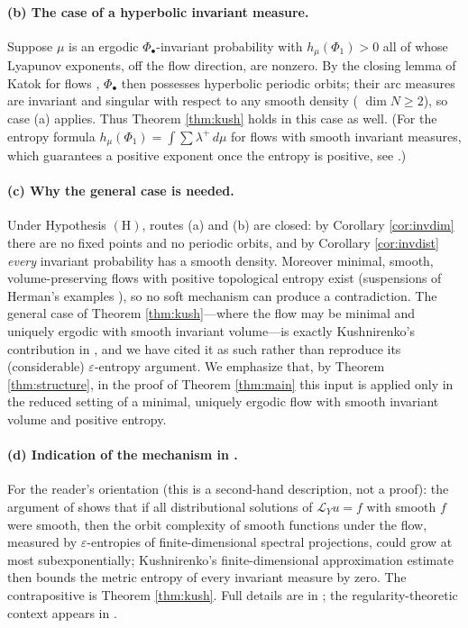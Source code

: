 \documentclass[11pt]{amsart}
\theoremstyle{plain}
\theoremstyle{definition}
\theoremstyle{remark}
\begin{document}
\paragraph{(b) The case of a hyperbolic invariant measure.}
Suppose $\mu$ is an ergodic $\Phi_\bullet$-invariant probability with
$h_\mu(\Phi_1)>0$ all of whose Lyapunov exponents, off the flow
direction, are nonzero. By the closing lemma of Katok for flows
\cite{Katok,KH}, $\Phi_\bullet$ then possesses hyperbolic periodic
orbits; their arc measures are invariant and singular with respect to
any smooth density ( $\dim N\ge2$), so case (a) applies. Thus
Theorem \ref{thm:kush} holds in this case as well. (For the entropy
formula $h_\mu(\Phi_1)=\int\sum\lambda^+\,d\mu$ for flows with smooth
invariant measures, which guarantees a positive exponent once the
entropy is positive, see \cite{HPT,BCF}.)

\paragraph{(c) Why the general case is needed.}
Under Hypothesis $(\mathrm{H})$, routes (a) and (b) are closed:
by Corollary \ref{cor:invdim} there are no fixed points and no periodic
orbits, and by Corollary \ref{cor:invdist} \emph{every} invariant
probability has a smooth density. Moreover minimal, smooth,
volume-preserving flows with positive topological entropy exist
(suspensions of Herman's examples \cite{LWW}), so no soft mechanism can
produce a contradiction. The general case of Theorem
\ref{thm:kush}---where the flow may be minimal and uniquely ergodic
with smooth invariant volume---is exactly Kushnirenko's contribution in
\cite{Kus}, and we have cited it as such rather than reproduce its
(considerable) $\varepsilon$-entropy argument. We emphasize that, by
Theorem \ref{thm:structure}, in the proof of Theorem \ref{thm:main} this
input is applied only in the reduced setting of a minimal, uniquely
ergodic flow with smooth invariant volume and positive entropy.

\paragraph{(d) Indication of the mechanism in \cite{Kus}.}
For the reader's orientation (this is a second-hand description, not a
proof): the argument of \cite{Kus} shows that if all distributional
solutions of $\mathcal L_Yu=f$ with smooth $f$ were smooth, then the
orbit complexity of smooth functions under the flow, measured by
$\varepsilon$-entropies of finite-dimensional spectral projections,
could grow at most subexponentially; Kushnirenko's finite-dimensional
approximation estimate then bounds the metric entropy of every
invariant measure by zero. The contrapositive is Theorem
\ref{thm:kush}. Full details are in \cite{Kus}; the regularity-theoretic
context appears in \cite{dlLMM}.
\end{document}
